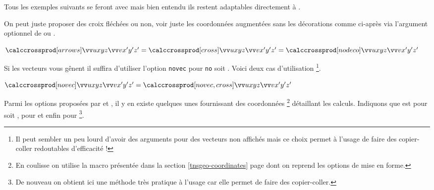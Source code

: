 \documentclass[12pt,a4paper]{article}
\begin{document}
\begin{remark}
    Tous les exemples suivants se feront avec  mais bien entendu ils restent adaptables directement à .
\end{remark}





On peut juste proposer des croix fléchées ou non, voir juste les coordonnées \og augmentées \fg{} sans les décorations comme ci-après via l'argument optionnel de  ou .

\begin{latexex}
$ \vcalccrossprod[arrows]{u}{x}{y}{z}%
                         {v}{x'}{y'}{z'}
= \vcalccrossprod[cross] {u}{x}{y}{z}%
                         {v}{x'}{y'}{z'}
= \vcalccrossprod[nodeco]{u}{x}{y}{z}%
                         {v}{x'}{y'}{z'}$
\end{latexex}





Si les vecteurs vous gênent il suffira d'utiliser l'option \verb+novec+ pour \verb+no+  soit .
Voici deux cas d'utilisation
\footnote{
	Il peut sembler un peu lourd d'avoir des arguments pour des vecteurs non affichés mais ce choix permet à l'usage de faire des copier-coller redoutables d'efficacité !
}.


\begin{latexex}
$ \vcalccrossprod[novec]
      {u}{x}{y}{z}{v}{x'}{y'}{z'}
= \vcalccrossprod[novec,cross]
      {u}{x}{y}{z}{v}{x'}{y'}{z'}$
\end{latexex}






Parmi les options proposées par  et , il y en existe quelques unes fournissant des coordonnées
\footnote{
	En coulisse on utilise la macro  présentée dans la section \ref{tnsgeo-coordinates} page \pageref{tnsgeo-coordinates} dont on reprend les options de mise en forme. 
}
détaillant les calculs. Indiquons que  est pour  soit ,  pour  et enfin  pour 
\footnote{
	De nouveau on obtient ici une méthode très pratique à l'usage car elle permet de faire des copier-coller.
}.
\end{document}
